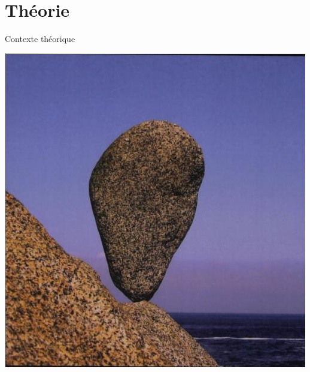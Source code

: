 \documentclass{eecslides}
\begin{document}
	\section{Théorie}
	



	\begin{frame}{Contexte théorique}
		\begin{center}
		\includegraphics[height=0.6\textheight]{scheffer}\\
		\end{center}
	\end{frame}

\end{document}
